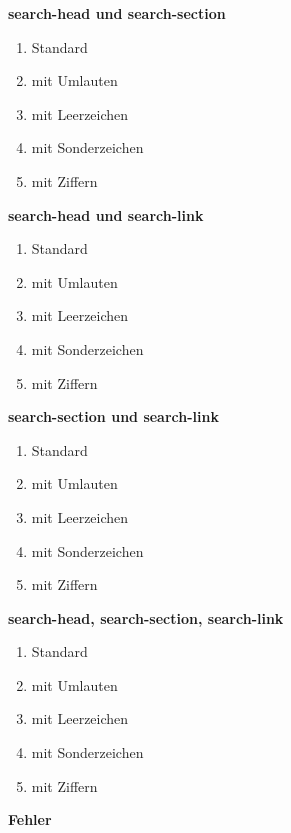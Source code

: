 \pagebreak


\textbf{search-head und search-section} 
\begin{enumerate}
 	\item Standard
  	\item mit Umlauten
	\item mit Leerzeichen
	\item mit Sonderzeichen
	\item mit Ziffern
\end{enumerate}


\textbf{search-head und search-link} 
\begin{enumerate}
   \item Standard
   \item mit Umlauten
   \item mit Leerzeichen
   \item mit Sonderzeichen
   \item mit Ziffern
\end{enumerate}


\textbf{search-section und search-link} 
\begin{enumerate}
   \item Standard
   \item mit Umlauten
   \item mit Leerzeichen
   \item mit Sonderzeichen
   \item mit Ziffern
\end{enumerate}



\textbf{search-head, search-section, search-link}
\begin{enumerate}
   \item Standard
   \item mit Umlauten
   \item mit Leerzeichen
   \item mit Sonderzeichen
   \item mit Ziffern
\end{enumerate}

\pagebreak

\textbf{{\large Fehler}}

